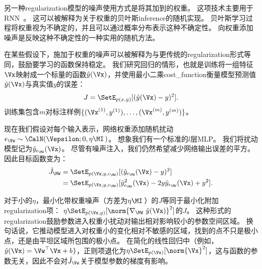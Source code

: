 另一种\gls{regularization}模型的噪声使用方式是将其加到的权重。
这项技术主要用于\gls{RNN}~\citep{Jim-et-al-1996,Graves-2011}。
这可以被解释为关于权重的贝叶斯\gls{inference}的随机实现。
贝叶斯学习过程将权重视为不确定的，并且可以通过概率分布表示这种不确定性。
向权重添加噪声是反映这种不确定性的一种实用的随机方法。

在某些假设下，施加于权重的噪声可以被解释为与更传统的\gls{regularization}形式等同，鼓励要学习的函数保持稳定。
我们研究回归的情形，也就是训练将一组特征$\Vx$映射成一个标量的函数$\hat y(\Vx)$，并使用最小二乘\gls{cost_function}衡量模型预测值$\hat y(\Vx)$与真实值$y$的误差：
\begin{align}
 J = \SetE_{p(x,y)}[(\hat y(\Vx) - y)^2].
\end{align}
训练集包含$m$对标注样例$\{(\Vx^{(1)}, y^{(1)}),\dots,(\Vx^{(m)}, y^{(m)})\}$。

现在我们假设对每个输入表示，网络权重添加随机扰动$\epsilon_{\Vw} \sim \CalN(\Vepsilon;0, \eta\MI \, )$。
想象我们有一个标准的$l$层MLP。
我们将扰动模型记为$\hat y_{\epsilon_{\MW}} (\Vx)$。
尽管有噪声注入，我们仍然希望减少网络输出误差的平方。
因此目标函数变为：
\begin{align}
 \tilde J_{\MW} &= \SetE_{p(\Vx,y,\epsilon_{\MW})}[(\hat y_{\epsilon_{\MW}}(\Vx) - y)^2] \\
   &=  \SetE_{p(\Vx,y,\epsilon_{\MW})}[\hat y_{\epsilon_{\MW}}^2(\Vx) -  2y\hat y_{\epsilon_{\MW}}
   (\Vx)+ y^2] .
\end{align}

对于小的$\eta$，最小化带权重噪声（方差为$\eta \MI$\,）的$J$等同于最小化附加\gls{regularization}项：
$ \eta \SetE_{p(\Vx,y)}[\norm{\nabla_{\MW}~\hat y(\Vx)}^2]$的$J$。
这种形式的\gls{regularization}鼓励参数进入权重小扰动对输出相对影响较小的参数空间区域。
换句话说，它推动模型进入对权重小的变化相对不敏感的区域，找到的点不只是极小点，还是由平坦区域所包围的极小点\citep{Hochreiter-Schmidhuber-1995}。
在简化的线性回归中（例如，$\hat y(\Vx) = \Vw^\top \Vx + b$），正则项退化为$ \eta \SetE_{p(\Vx)}[\norm{\Vx}^2]$，这与函数的参数无关，因此不会对$\tilde J_{\Vw}$关于模型参数的梯度有影响。


